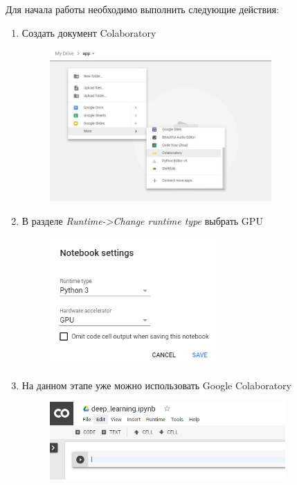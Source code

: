 Для начала работы необходимо выполнить следующие действия:
\begin{enumerate}\label{alg:colab_settings}
\item Создать документ Colaboratory
\begin{figure}[h]
    \centering
    \includegraphics[width=0.8\textwidth]{colab_settings_1.jpeg}
    \label{fig:colab_settings_1}
\end{figure}

\item В разделе \textsl{Runtime->Change runtime type} выбрать GPU
\begin{figure}[h]
    \centering
    \includegraphics[width=0.6\textwidth]{colab_settings_2.png}
    \label{fig:colab_settings_2}
\end{figure}

\newpage

\item На данном этапе уже можно использовать Google Colaboratory
\begin{figure}[h]
    \centering
    \includegraphics[width=0.85\textwidth]{colab_settings_3.png}
    \label{fig:colab_settings_3}
\end{figure}


\end{enumerate}
